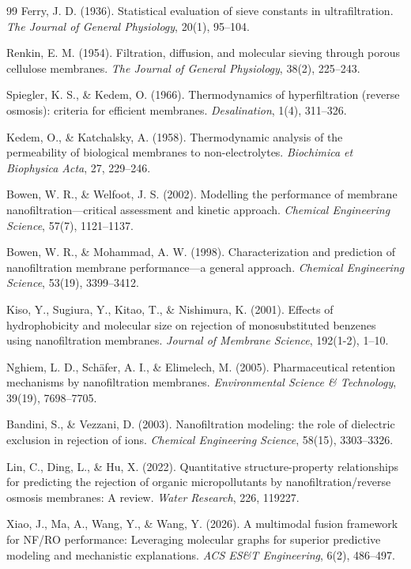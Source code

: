 \documentclass[10pt,twocolumn]{article}
\begin{document}
\begin{thebibliography}{99}
 Ferry, J. D. (1936). Statistical evaluation of sieve constants in ultrafiltration. \textit{The Journal of General Physiology}, 20(1), 95--104.

 Renkin, E. M. (1954). Filtration, diffusion, and molecular sieving through porous cellulose membranes. \textit{The Journal of General Physiology}, 38(2), 225--243.

 Spiegler, K. S., \& Kedem, O. (1966). Thermodynamics of hyperfiltration (reverse osmosis): criteria for efficient membranes. \textit{Desalination}, 1(4), 311--326.

 Kedem, O., \& Katchalsky, A. (1958). Thermodynamic analysis of the permeability of biological membranes to non-electrolytes. \textit{Biochimica et Biophysica Acta}, 27, 229--246.

 Bowen, W. R., \& Welfoot, J. S. (2002). Modelling the performance of membrane nanofiltration---critical assessment and kinetic approach. \textit{Chemical Engineering Science}, 57(7), 1121--1137.

 Bowen, W. R., \& Mohammad, A. W. (1998). Characterization and prediction of nanofiltration membrane performance---a general approach. \textit{Chemical Engineering Science}, 53(19), 3399--3412.

 Kiso, Y., Sugiura, Y., Kitao, T., \& Nishimura, K. (2001). Effects of hydrophobicity and molecular size on rejection of monosubstituted benzenes using nanofiltration membranes. \textit{Journal of Membrane Science}, 192(1-2), 1--10.

 Nghiem, L. D., Sch\"afer, A. I., \& Elimelech, M. (2005). Pharmaceutical retention mechanisms by nanofiltration membranes. \textit{Environmental Science \& Technology}, 39(19), 7698--7705.

 Bandini, S., \& Vezzani, D. (2003). Nanofiltration modeling: the role of dielectric exclusion in rejection of ions. \textit{Chemical Engineering Science}, 58(15), 3303--3326.

 Lin, C., Ding, L., \& Hu, X. (2022). Quantitative structure-property relationships for predicting the rejection of organic micropollutants by nanofiltration/reverse osmosis membranes: A review. \textit{Water Research}, 226, 119227.

 Xiao, J., Ma, A., Wang, Y., \& Wang, Y. (2026). A multimodal fusion framework for NF/RO performance: Leveraging molecular graphs for superior predictive modeling and mechanistic explanations. \textit{ACS ES\&T Engineering}, 6(2), 486--497.


\end{thebibliography}
\end{document}
